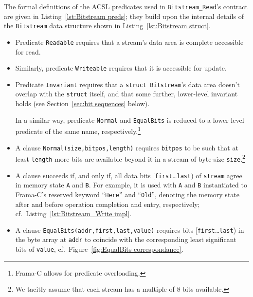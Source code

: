 The formal definitions of the ACSL predicates used
in \lstinline{Bitstream_Read}'s contract are given in
Listing~\ref{lst:Bitstream preds}; they build upon the internal
details of the \lstinline{Bitstream} data structure shown in
Listing~\ref{lst:Bitstream struct}.
%
\begin{itemize}
\item Predicate \lstinline{Readable} requires that a stream's data area is
	complete accessible for read.
\item Similarly, predicate \lstinline{Writeable} requires that it is
	accessible for update.

\item Predicate \lstinline{Invariant} requires that a 
	\lstinline{struct Bitstream}'s data area
	doesn't overlap with the \lstinline{struct} itself, and that some
	further, lower-level invariant holds (see 
	Section~\ref{sec:bit sequences} below).

	In a similar way, predicate \lstinline{Normal} and
	\lstinline{EqualBits} is reduced to a
	lower-level predicate of the same 
	name, 
	respectively.\footnote{Frama-C allows for predicate overloading.}

\item
	A clause \lstinline{Normal(size,bitpos,length)} requires
	\lstinline{bitpos} to be such that at least \lstinline{length}
	more bits are available beyond it in a stream of byte-size
	\lstinline{size}.\footnote{
		We tacitly assume that each stream has a multiple of 8 bits
		available.
	}

\item
	A clause
	 succeeds if,
	and only if, 
	all data bits [\lstinline{first}\ldots\lstinline{last})
	of \lstinline{stream} agree in memory state \lstinline{A} and
	\lstinline{B}.
	For example, it is used with \lstinline{A} and \lstinline{B}
	instantiated to Frama-C's reserved keyword ``\lstinline{Here}'' and
	``\lstinline{Old}'', denoting the memory state after and before
	operation completion and entry, respectively; cf.\
	Listing~\ref{lst:Bitstream_Write impl}.

\item
	A clause \lstinline{EqualBits(addr,first,last,value)} requires 
	bits [\lstinline{first}\ldots\lstinline{last}) in
	the byte array at \lstinline{addr} to coincide with the
	corresponding least significant bits of \lstinline{value},
	cf.~Figure~\ref{fig:EqualBits correspondance}.
\end{itemize}


